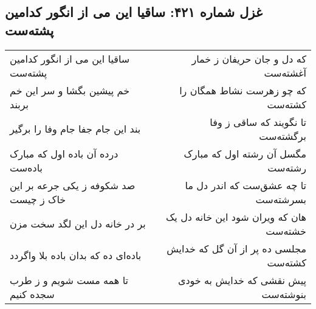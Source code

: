 \begin{center}
\section*{غزل شماره ۴۲۱: ساقیا این می از انگور کدامین پشته‌ست}
\label{sec:0421}
\begin{longtable}{l p{0.5cm} r}
ساقیا این می از انگور کدامین پشته‌ست
&&
که دل و جان حریفان ز خمار آغشته‌ست
\\
خم پیشین بگشا و سر این خم بربند
&&
که چو زهرست نشاط همگان را کشته‌ست
\\
بند این جام جفا جام وفا را برگیر
&&
تا نگویند که ساقی ز وفا برگشته‌ست
\\
درده آن باده اول که مبارک باده‌ست
&&
مگسل آن رشته اول که مبارک رشته‌ست
\\
صد شکوفه ز یکی جرعه بر این خاک ز چیست
&&
تا چه عشق‌ست که اندر دل ما بسرشته‌ست
\\
بر در خانه دل این لگد سخت مزن
&&
هان که ویران شود این خانه دل یک خشته‌ست
\\
باده‌ای ده که بدان باده بلا واگردد
&&
مجلسی ده پر از آن گل که خدایش کشته‌ست
\\
تا همه مست شویم و ز طرب سجده کنیم
&&
پیش نقشی که خدایش به خودی بنوشته‌ست
\\
\end{longtable}
\end{center}
